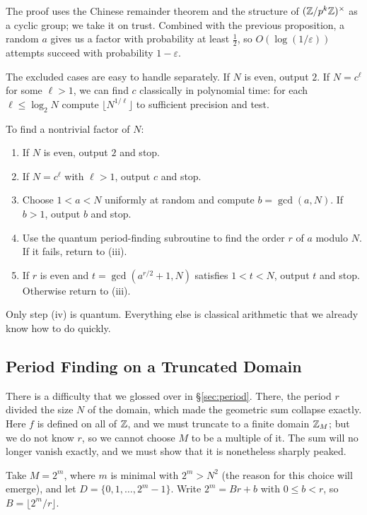 \documentclass[a4paper]{scrartcl}
\begin{document}
The proof uses the Chinese remainder theorem and the structure of $(\mathbb{Z}/p^k\mathbb{Z})^\times$ as a cyclic group; we take it on trust. Combined with the previous proposition, a random $a$ gives us a factor with probability at least $\tfrac12$, so $O(\log(1/\varepsilon))$ attempts succeed with probability $1-\varepsilon$.

The excluded cases are easy to handle separately. If $N$ is even, output $2$. If $N = c^\ell$ for some $\ell>1$, we can find $c$ classically in polynomial time: for each $\ell\leq\log_2N$ compute $\lfloor N^{1/\ell}\rfloor$ to sufficient precision and test.

\begin{method*}
	To find a nontrivial factor of $N$:
	\begin{enumerate}[label=(\roman*)]
		\item If $N$ is even, output $2$ and stop.
		\item If $N = c^\ell$ with $\ell>1$, output $c$ and stop.
		\item Choose $1<a<N$ uniformly at random and compute $b = \gcd(a,N)$. If $b>1$, output $b$ and stop.
		\item Use the quantum period-finding subroutine to find the order $r$ of $a$ modulo $N$. If it fails, return to (iii).
		\item If $r$ is even and $t = \gcd(a^{r/2}+1,N)$ satisfies $1<t<N$, output $t$ and stop. Otherwise return to (iii).
	\end{enumerate}
\end{method*}

Only step (iv) is quantum. Everything else is classical arithmetic that we already know how to do quickly.

\subsection{Period Finding on a Truncated Domain}

There is a difficulty that we glossed over in \S\ref{sec:period}. There, the period $r$ divided the size $N$ of the domain, which made the geometric sum collapse exactly. Here $f$ is defined on all of $\mathbb{Z}$, and we must truncate to a finite domain $\mathbb{Z}_M$; but we do not know $r$, so we cannot choose $M$ to be a multiple of it. The sum will no longer vanish exactly, and we must show that it is nonetheless sharply peaked.

Take $M = 2^m$, where $m$ is minimal with $2^m > N^2$ (the reason for this choice will emerge), and let $D = \{0,1,\dots,2^m-1\}$. Write $2^m = Br + b$ with $0\leq b<r$, so $B = \lfloor 2^m/r\rfloor$.
\end{document}

